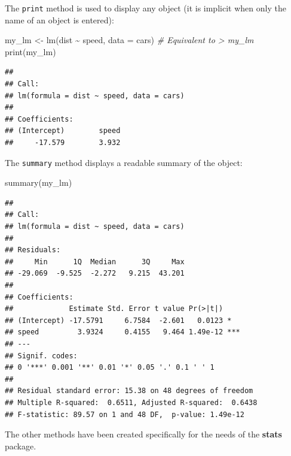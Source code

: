 \documentclass[
  12pt,
  american,
  a4paper,
  extrafontsizes,onecolumn,openright
  ]{memoir}
\newenvironment{Shaded}{\begin{snugshade}}{\end{snugshade}}
\newcommand{\AttributeTok}[1]{\textcolor[rgb]{0.77,0.63,0.00}{#1}}
\newcommand{\CommentTok}[1]{\textcolor[rgb]{0.56,0.35,0.01}{\textit{#1}}}
\newcommand{\FunctionTok}[1]{\textcolor[rgb]{0.00,0.00,0.00}{#1}}
\newcommand{\NormalTok}[1]{#1}
\newcommand{\OtherTok}[1]{\textcolor[rgb]{0.56,0.35,0.01}{#1}}
\newcommand{\SpecialCharTok}[1]{\textcolor[rgb]{0.00,0.00,0.00}{#1}}
\begin{document}
\normalsize

The \texttt{print} method is used to display any object (it is implicit when only the name of an object is entered):

\scriptsize

\begin{Shaded}
\begin{Highlighting}[]
\NormalTok{my\_lm }\OtherTok{\textless{}{-}} \FunctionTok{lm}\NormalTok{(dist }\SpecialCharTok{\textasciitilde{}}\NormalTok{ speed, }\AttributeTok{data =}\NormalTok{ cars)}
\CommentTok{\# Equivalent to \textquotesingle{}\textgreater{} my\_lm\textquotesingle{}}
\FunctionTok{print}\NormalTok{(my\_lm)}
\end{Highlighting}
\end{Shaded}

\begin{verbatim}
## 
## Call:
## lm(formula = dist ~ speed, data = cars)
## 
## Coefficients:
## (Intercept)        speed  
##     -17.579        3.932
\end{verbatim}

\normalsize

The \texttt{summary} method displays a readable summary of the object:

\scriptsize

\begin{Shaded}
\begin{Highlighting}[]
\FunctionTok{summary}\NormalTok{(my\_lm)}
\end{Highlighting}
\end{Shaded}

\begin{verbatim}
## 
## Call:
## lm(formula = dist ~ speed, data = cars)
## 
## Residuals:
##     Min      1Q  Median      3Q     Max 
## -29.069  -9.525  -2.272   9.215  43.201 
## 
## Coefficients:
##             Estimate Std. Error t value Pr(>|t|)    
## (Intercept) -17.5791     6.7584  -2.601   0.0123 *  
## speed         3.9324     0.4155   9.464 1.49e-12 ***
## ---
## Signif. codes:  
## 0 '***' 0.001 '**' 0.01 '*' 0.05 '.' 0.1 ' ' 1
## 
## Residual standard error: 15.38 on 48 degrees of freedom
## Multiple R-squared:  0.6511, Adjusted R-squared:  0.6438 
## F-statistic: 89.57 on 1 and 48 DF,  p-value: 1.49e-12
\end{verbatim}

\normalsize

The other methods have been created specifically for the needs of the \textbf{stats} package.
\end{document}
